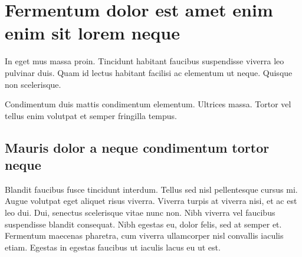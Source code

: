 \documentclass{HyperedReport}
\begin{document}
\thispagestyle{empty}

\section*{Fermentum dolor est amet enim enim sit lorem neque}

In eget mus massa proin. Tincidunt habitant faucibus suspendisse viverra leo pulvinar duis. Quam id lectus habitant facilisi ac elementum ut neque. Quisque non scelerisque.

Condimentum duis mattis condimentum elementum. Ultrices massa. Tortor vel tellus enim volutpat et semper fringilla tempus.

\subsection*{Mauris dolor a neque condimentum tortor neque}

Blandit faucibus fusce tincidunt interdum. Tellus sed nisl pellentesque cursus mi. Augue volutpat eget aliquet risus viverra. Viverra turpis at viverra nisi, et ac est leo dui. Dui, senectus scelerisque vitae nunc non. Nibh viverra vel faucibus suspendisse blandit consequat. Nibh egestas eu, dolor felis, sed at semper et. Fermentum maecenas pharetra, cum viverra ullamcorper nisl convallis iaculis etiam. Egestas in egestas faucibus ut iaculis lacus eu ut est.
\end{document}
